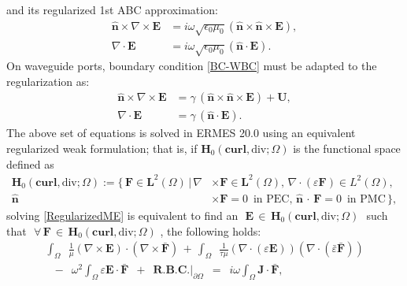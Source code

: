 and its regularized 1st ABC approximation:
\begin{equation}\label{ABCExtend}
	\begin{aligned}
		\mathbf{\hat{n}}\times\nabla\times\mathbf{E} &= i\omega\sqrt{\epsilon_{0}\mu_{0}}\left(\mathbf{\hat{n}}\times\mathbf{\hat{n}}\times\mathbf{E}\right),
		\\
		\nabla\cdot\mathbf{E} &= i\omega\sqrt{\epsilon_{0}\mu_{0}}\left(\mathbf{\hat{n}}\cdot\mathbf{E}\right).
	\end{aligned}
\end{equation}
On waveguide ports, boundary condition \eqref{BC-WBC} must be adapted to the regularization as:
\begin{equation}\label{BC-RWPC}
	\begin{aligned}
		\mathbf{\hat{n}}\times\nabla\times\mathbf{E} &= \gamma\,(\mathbf{\hat{n}}\times\mathbf{\hat{n}}\times\mathbf{E}) + \mathbf{U},
		\\
		\nabla\cdot\mathbf{E} &= \gamma\,\left(\mathbf{\hat{n}}\cdot\mathbf{E}\right).
	\end{aligned}
\end{equation}
The above set of equations is solved in ERMES 20.0 using an equivalent regularized weak formulation; that is, if $\mathbf{H}_{0}(\mathbf{curl},\text{div};\Omega)$ is the functional space defined as
\begin{equation}\label{HcurlDiv}
	\begin{aligned}
		\mathbf{H}_{0}(\mathbf{curl},\text{div};\Omega):=\{\,\mathbf{F}\in \mathbf{L}^{2}(\Omega)\,|\,\nabla&\times \mathbf{F}\in\mathbf{L}^{2}(\Omega),\,\nabla\cdot(\varepsilon\mathbf{F})\in L^{2}(\Omega),\\ \mathbf{\hat{n}}&\times\mathbf{F} = 0\enspace\text{in PEC},\,\mathbf{\hat{n}}\,\cdot\,\mathbf{F} = 0\enspace\text{in PMC}\,\},
	\end{aligned}
\end{equation}
solving \eqref{RegularizedME} is equivalent to find an $\,\,\mathbf{E}\,\in\,\mathbf{H}_{0}(\mathbf{curl},\text{div};\Omega)\,\,$
such that $\,\,\forall\,\mathbf{F}\,\in\,\mathbf{H}_{0}(\mathbf{curl},\text{div};\Omega)\,\,$, the following holds:
\begin{equation}\label{RegularizedWeak}
	\begin{aligned}
		\int_{\Omega}\enspace\frac{1}{\mu}\left(\nabla\times\mathbf{E}\right)\cdot\left(\nabla\times\mathbf{\bar{F}}\right)\, + \,\int_{\Omega}\enspace\frac{1}{\tau\mu}\left(\nabla\cdot\left(\varepsilon\mathbf{E}\right)\right)\left(\nabla\cdot\left(\bar{\varepsilon}\mathbf{\bar{F}}\right)\right)
		\\
		\,\,\,\,-\enspace\omega^{2}\int_{\Omega}\varepsilon\mathbf{E}\cdot\mathbf{\bar{F}}\enspace + \enspace \textbf{R.B.C.}|_{\partial\Omega}\enspace = \enspace i\omega\int_{\Omega}\mathbf{J}\cdot\mathbf{\bar{F}},
	\end{aligned}
\end{equation}
